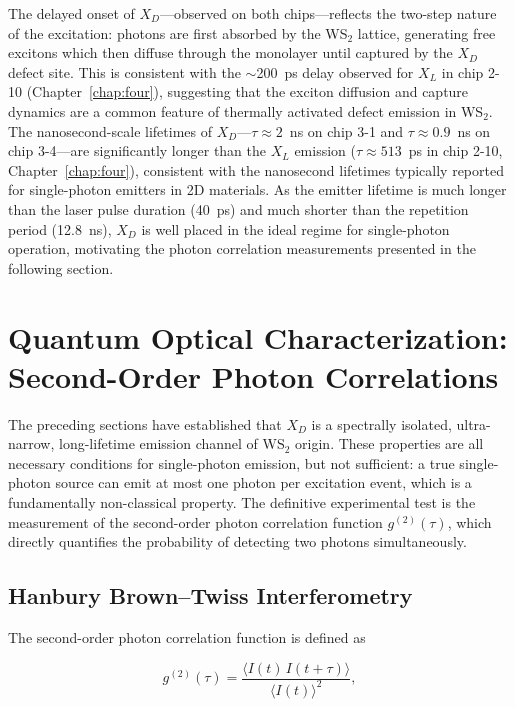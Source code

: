 The delayed onset of $X_D$---observed on both chips---reflects the two-step nature of the excitation: photons are first absorbed by the WS$_2$ lattice, generating free excitons which then diffuse through the monolayer until captured by the $X_D$ defect site. This is consistent with the $\sim$200~ps delay observed for $X_L$ in chip 2-10 (Chapter~\ref{chap:four}), suggesting that the exciton diffusion and capture dynamics are a common feature of thermally activated defect emission in WS$_2$. The nanosecond-scale lifetimes of $X_D$---$\tau \approx 2$~ns on chip 3-1 and $\tau \approx 0.9$~ns on chip 3-4---are significantly longer than the $X_L$ emission ($\tau \approx 513$~ps in chip 2-10, Chapter~\ref{chap:four}), consistent with the nanosecond lifetimes typically reported for single-photon emitters in 2D materials. As the emitter lifetime is much longer than the laser pulse duration (40~ps) and much shorter than the repetition period (12.8~ns), $X_D$ is well placed in the ideal regime for single-photon operation, motivating the photon correlation measurements presented in the following section.


\section{Quantum Optical Characterization: Second-Order Photon Correlations}
\label{sec:Quantum Optical Characterization: Second-Order Photon Correlations}

The preceding sections have established that $X_D$ is a spectrally isolated, ultra-narrow, long-lifetime emission channel of WS$_2$ origin. These properties are all necessary conditions for single-photon emission, but not sufficient: a true single-photon source can emit at most one photon per excitation event, which is a fundamentally non-classical property. The definitive experimental test is the measurement of the second-order photon correlation function $g^{(2)}(\tau)$, which directly quantifies the probability of detecting two photons simultaneously.

\subsection{Hanbury Brown--Twiss Interferometry}
\label{subsec:Hanbury Brown-Twiss Interferometry}

The second-order photon correlation function is defined as

\begin{equation}
g^{(2)}(\tau) = \frac{\langle I(t)\, I(t+\tau) \rangle}{\langle I(t)\rangle^2},
\label{eq:g2}
\end{equation}

